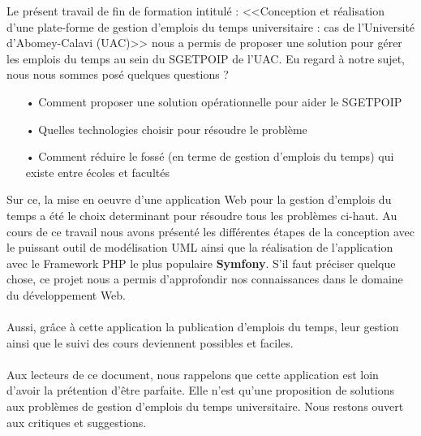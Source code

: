 \conclusion
Le présent travail de fin de formation intitulé : <<Conception et réalisation d'une plate-forme de gestion d'emplois du temps universitaire : cas de l'Université d'Abomey-Calavi (UAC)>> nous a permis de proposer une solution pour gérer les emplois du temps au sein du \gls{SGETPOIP} de l'\gls{UAC}.
Eu regard à notre sujet, nous nous sommes posé quelques questions ?
\begin{itemize}
\item[•] Comment proposer une solution opérationnelle pour aider le \gls{SGETPOIP}
\item[•] Quelles technologies choisir pour résoudre le problème
\item[•] Comment réduire le fossé (en terme de gestion d'emplois du temps) qui existe entre écoles et facultés
\end{itemize}
Sur ce, la mise en oeuvre d'une application Web pour la gestion d'emplois du temps a été le choix determinant pour résoudre tous les problèmes ci-haut.
Au cours de ce travail nous avons présenté les différentes étapes de la conception avec le puissant outil de modélisation \gls{UML} ainsi que la réalisation de l'application avec le Framework \gls{PHP} le plus populaire \textbf{Symfony}. S'il faut préciser quelque chose, ce projet nous a permis d'approfondir nos connaissances dans le domaine du développement Web.
\paragraph{}
Aussi, grâce à cette application la publication d'emplois du temps, leur gestion ainsi que le suivi des cours deviennent possibles et faciles.
\paragraph{}
Aux lecteurs de ce document, nous rappelons que cette application est loin d'avoir la prétention d'être parfaite. Elle n'est qu'une proposition de solutions aux problèmes de gestion d'emplois du temps universitaire. Nous restons ouvert aux critiques et suggestions.
\paragraph{}

